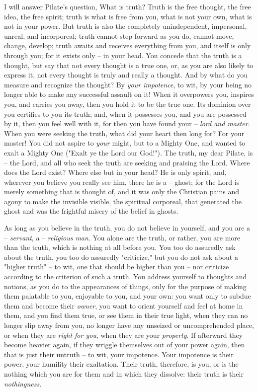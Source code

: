 I will answer Pilate's question, What is truth? Truth is the free thought, the 
free idea, the free spirit; truth is what is free from you, what is not your 
own, what is not in your power. But truth is also the completely 
unindependent, impersonal, unreal, and incorporeal; truth cannot step forward 
as you do, cannot move, change, develop; truth awaits and receives everything 
from you, and itself is only through you; for it exists only -- in your head. 
You concede that the truth is a thought, but say that not every thought is a 
true one, or, as you are also likely to express it, not every thought is truly 
and really a thought. And by what do you measure and recognize the thought? By 
\textit{your impotence}, to wit, by your being no longer able to make any 
successful assault on it! When it overpowers you, inspires you, and carries 
you away, then you hold it to be the true one. Its dominion over you certifies 
to you its truth; and, when it possesses you, and you are possessed by it, 
then you feel well with it, for then you have found your -- \textit{lord and 
master}. When you were seeking the truth, what did your heart then long for? 
For your master! You did not aspire to \textit{your} might, but to a Mighty 
One, and wanted to exalt a Mighty One ("{}Exalt ye the Lord our God!"{}). The 
truth, my dear Pilate, is -- the Lord, and all who seek the truth are seeking 
and praising the Lord. Where does the Lord exist? Where else but in your head? 
He is only spirit, and, wherever you believe you really see him, there he is a 
-- ghost; for the Lord is merely something that is thought of, and it was only 
the Christian pains and agony to make the invisible visible, the spiritual 
corporeal, that generated the ghost and was the frightful misery of the belief 
in ghosts.

As long as you believe in the truth, you do not believe in yourself, and you 
are a -- \textit{servant}, a -- \textit{religious man}. You alone are the 
truth, or rather, you are more than the truth, which is nothing at all before 
you. You too do assuredly ask about the truth, you too do assuredly 
"{}criticize,"{} but you do not ask about a "{}higher truth"{} -- to wit, one 
that should be higher than you -- nor criticize according to the criterion of 
such a truth. You address yourself to thoughts and notions, as you do to the 
appearances of things, only for the purpose of making them palatable to you, 
enjoyable to you, and your own: you want only to subdue them and become their 
\textit{owner}, you want to orient yourself and feel at home in them, and you 
find them true, or see them in their true light, when they can no longer slip 
away from you, no longer have any unseized or uncomprehended place, or when 
they are \textit{right for you}, when they are your \textit{property}. If 
afterward they become heavier again, if they wriggle themselves out of your 
power again, then that is just their untruth -- to wit, your impotence. Your 
impotence is their power, your humility their exaltation. Their truth, 
therefore, is you, or is the nothing which you are for them and in which they 
dissolve: their truth is their \textit{nothingness}.

